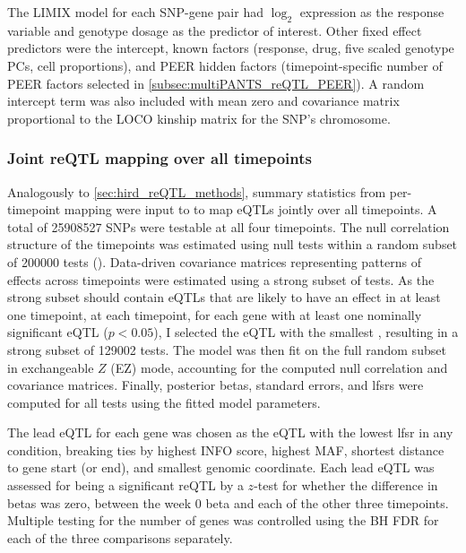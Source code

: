 The {LIMIX} model for each \gls{SNP}-gene pair had 
$\log_2$ expression as the response variable
and genotype dosage as the predictor of interest.
Other fixed effect predictors were
the intercept,
known factors (response, drug, five scaled genotype \glspl{PC}, cell proportions), 
and PEER hidden factors (timepoint-specific number of PEER factors selected in \cref{subsec:multiPANTS_reQTL_PEER}).
A random intercept term was also included with mean zero and covariance matrix proportional to the \gls{LOCO} kinship matrix for the \gls{SNP}'s chromosome.

\subsubsection{Joint reQTL mapping over all timepoints}

Analogously to \cref{sec:hird_reQTL_methods},
summary statistics from per-timepoint mapping were input to  \autocite{urbut2018FlexibleStatisticalMethods} to map \glspl{eQTL} jointly over all timepoints.
A total of \num{25908527} \glspl{SNP} were testable at all four timepoints.
The null correlation structure of the timepoints was estimated using null tests within a random subset of \num{200000} tests ().
Data-driven covariance matrices representing patterns of effects across timepoints were estimated using a strong subset of tests.
As the strong subset should contain \glspl{eQTL} that are likely to have an effect in at least one timepoint,
at each timepoint, for each gene with at least one nominally significant \gls{eQTL} ($p < 0.05$), I selected the \gls{eQTL} with the smallest \pvalue{}, resulting in a strong subset of \num{129002} tests.
The  model was then fit on the full random subset in exchangeable $Z$ (EZ) mode, accounting for the computed null correlation and covariance matrices.
Finally, posterior betas, standard errors, and \glspl{lfsr} were computed for all tests using the fitted model parameters.

The lead \gls{eQTL} for each gene was chosen as the \gls{eQTL} with the lowest \gls{lfsr} in any condition, 
breaking ties by highest INFO score, highest \gls{MAF}, shortest distance to gene start (or end), and smallest genomic coordinate.
Each lead \gls{eQTL} was assessed for being a significant \gls{reQTL} by a $z$-test for whether the difference in betas was zero, between the week 0 beta and each of the other three timepoints.
Multiple testing for the number of genes was controlled using the \gls{BH} \gls{FDR} for each of the three comparisons separately.

